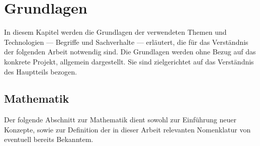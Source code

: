 
\chapter{Grundlagen}
\label{ch:Grundlagen}

In diesem Kapitel werden die Grundlagen der verwendeten Themen und Technologien --- Begriffe und Sachverhalte --- erläutert, die für das Verständnis der folgenden Arbeit notwendig sind.
Die Grundlagen werden ohne Bezug auf das konkrete Projekt, allgemein dargestellt. Sie sind zielgerichtet auf das Verständnis des Hauptteils bezogen.

\section{Mathematik}

Der folgende Abschnitt zur Mathematik dient sowohl zur Einführung neuer Konzepte, sowie zur Definition der in dieser Arbeit relevanten Nomenklatur von eventuell bereits Bekanntem.

